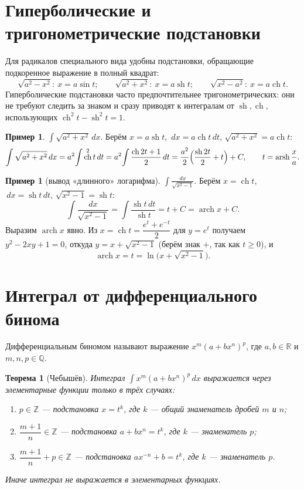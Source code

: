 \documentclass[11pt,a4paper]{article}
\theoremstyle{definition}
\newtheorem{example}[definition]{Пример}
\theoremstyle{plain}
\newtheorem{theorem}[definition]{Теорема}
\DeclareMathOperator{\sh}{sh}
\DeclareMathOperator{\ch}{ch}
\newcommand{\R}{\mathbb{R}}
\newcommand{\Z}{\mathbb{Z}}
\newcommand{\Q}{\mathbb{Q}}
\newcommand{\dx}{\,dx}
\newcommand{\dt}{\,dt}
\renewcommand{\ge}{\geqslant}
\begin{document}
\section{Гиперболические и тригонометрические подстановки}

Для радикалов специального вида удобны подстановки, обращающие подкоренное выражение в полный
квадрат:
\[
  \sqrt{a^2-x^2}:\ x=a\sin t;\qquad
  \sqrt{a^2+x^2}:\ x=a\sh t;\qquad
  \sqrt{x^2-a^2}:\ x=a\ch t .
\]
Гиперболические подстановки часто предпочтительнее тригонометрических: они не требуют следить за
знаком и сразу приводят к интегралам от $\sh,\ch$, использующих $\ch^2 t-\sh^2 t=1$.

\begin{example}
$\displaystyle\int\sqrt{a^2+x^2}\dx$. Берём $x=a\sh t$, $\dx=a\ch t\dt$, $\sqrt{a^2+x^2}=a\ch t$:
\[
  \int\sqrt{a^2+x^2}\dx=a^2\!\int\ch^2 t\dt=a^2\!\int\frac{\ch 2t+1}{2}\dt
   =\frac{a^2}{2}\Bigl(\frac{\sh 2t}{2}+t\Bigr)+C,\qquad t=\operatorname{arsh}\frac xa .
\]
\end{example}

\begin{example}[вывод «длинного» логарифма]
$\displaystyle\int\frac{dx}{\sqrt{x^2-1}}$. Берём $x=\ch t$, $\dx=\sh t\dt$,
$\sqrt{x^2-1}=\sh t$:
\[
  \int\frac{dx}{\sqrt{x^2-1}}=\int\frac{\sh t\dt}{\sh t}=t+C=\operatorname{arch} x+C .
\]
Выразим $\operatorname{arch} x$ явно. Из $x=\ch t=\dfrac{e^t+e^{-t}}2$ для $y=e^t$ получаем
$y^2-2xy+1=0$, откуда $y=x+\sqrt{x^2-1}$ (берём знак $+$, так как $t\ge0$), и
\[
  \operatorname{arch} x=t=\ln\bigl(x+\sqrt{x^2-1}\bigr).
\]
\end{example}

\section{Интеграл от дифференциального бинома}

Дифференциальным биномом называют выражение $x^m(a+bx^n)^p$, где $a,b\in\R$ и $m,n,p\in\Q$.

\begin{theorem}[Чебышёв]
Интеграл $\displaystyle\int x^m(a+bx^n)^p\dx$ выражается через элементарные функции \emph{только} в
трёх случаях:
\begin{enumerate}[label=\arabic*),leftmargin=*]
  \item $p\in\Z$ — подстановка $x=t^k$, где $k$ — общий знаменатель дробей $m$ и $n$;
  \item $\dfrac{m+1}{n}\in\Z$ — подстановка $a+bx^n=t^k$, где $k$ — знаменатель $p$;
  \item $\dfrac{m+1}{n}+p\in\Z$ — подстановка $ax^{-n}+b=t^k$, где $k$ — знаменатель $p$.
\end{enumerate}
Иначе интеграл не выражается в элементарных функциях.
\end{theorem}
\end{document}
